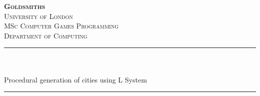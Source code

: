 \begin{titlepage}

\newcommand{\HRule}{\rule{\linewidth}{0.5mm}} %

\center %

\begin{center}
    

\textsc{\Huge \textbf {Goldsmiths}}\\ %
\textsc{\small University of London}\\[1.5cm] %
\textsc{\Large MSc Computer Games Programming}\\[0.5cm] %
\textsc{\large Department of Computing}\\[0.5cm] %

\makeatletter
\HRule \\[0.4cm]
{ \huge \bfseries \@title}\\[0.1cm] \large Procedural generation of cities using L System
\HRule \\[1.5cm]
 


~


\end{center}
\end{titlepage}
